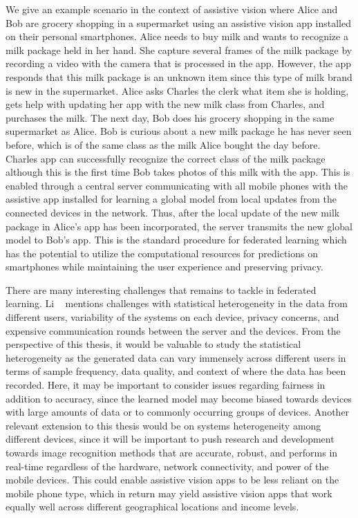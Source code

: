 We give an example scenario in the context of assistive vision where Alice and Bob are grocery shopping in a supermarket using an assistive vision app installed on their personal smartphones. Alice needs to buy milk and wants to recognize a milk package held in her hand. She capture several frames of the milk package by recording a video with the camera that is processed in the app. However, the app responds that this milk package is an unknown item since this type of milk brand is new in the supermarket. Alice asks Charles the clerk what item she is holding, gets help with updating her app with the new milk class from Charles, and purchases the milk. The next day, Bob does his grocery shopping in the same supermarket as Alice. Bob is curious about a new milk package he has never seen before, which is of the same class as the milk Alice bought the day before. Charles app can successfully recognize the correct class of the milk package although this is the first time Bob takes photos of this milk with the app. This is enabled through a central server communicating with all mobile phones with the assistive app installed for learning a global model from local updates from the connected devices in the network. Thus, after the local update of the new milk package in Alice's app has been incorporated, the server transmits the new global model to Bob's app. This is the standard procedure for federated learning which has the potential to utilize the computational resources for predictions on smartphones while maintaining the user experience and preserving privacy. 

There are many interesting challenges that remains to tackle in federated learning. Li \etal~\cite{li2020federated} mentions challenges with statistical heterogeneity in the data from different users, variability of the systems on each device, privacy concerns, and expensive communication rounds between the server and the devices. From the perspective of this thesis, it would be valuable to study the statistical heterogeneity as the generated data can vary immensely across different users in terms of sample frequency, data quality, and context of where the data has been recorded. Here, it may be important to consider issues regarding fairness in addition to accuracy, since the learned model may become biased towards devices with large amounts of data or to commonly occurring groups of devices. Another relevant extension to this thesis would be on systems heterogeneity among different devices, since it will be important to push research and development towards image recognition methods that are accurate, robust, and performs in real-time regardless of the hardware, network connectivity, and power of the mobile devices. This could enable assistive vision apps to be less reliant on the mobile phone type, which in return may yield assistive vision apps that work equally well across different geographical locations and income levels. 



